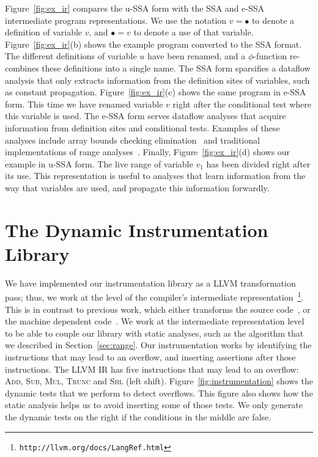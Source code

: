 \documentclass[preprint]{sigplanconf}[10pt]
\begin{document}
Figure~\ref{fig:ex_ir} compares the u-SSA form with the SSA and e-SSA
intermediate program representations.
We use the notation $v = \bullet$ to denote a definition of variable $v$, and
$\bullet = v$ to denote a use of that variable.
Figure~\ref{fig:ex_ir}(b) shows the example program converted to the SSA format.
The different definitions of variable $u$ have been renamed, and a
$\phi$-function re-combines these definitions into a single name.
The SSA form sparsifies a dataflow analysis that only extracts information from
the definition sites of variables, such as constant propagation.
Figure~\ref{fig:ex_ir}(c) shows the same program in e-SSA form.
This time we have renamed variable $v$ right after the conditional test where
this variable is used.
The e-SSA form serves dataflow analyses that acquire information from definition
sites and conditional tests.
Examples of these analyses include array bounds checking
elimination~\cite{Bodik00} and traditional implementations of range
analyses~\cite{Gough94,Patterson95}.
Finally, Figure~\ref{fig:ex_ir}(d) shows our example in u-SSA form.
The live range of variable $v_1$ has been divided right after its use.
This representation is useful to analyses that learn information from the way
that variables are used, and propagate this information forwardly.

\section{The Dynamic Instrumentation Library}
\label{sec:dyn}

We have implemented our instrumentation library as a LLVM transformation pass;
thus, we work at the level of the compiler's intermediate
representation~\footnote{\texttt{http://llvm.org/docs/LangRef.html}}.
This is in contrast to previous work, which either transforms the
source code~\cite{Dietz12}, or the machine dependent code~\cite{Brumley07}.
We work at the intermediate representation level to be able to couple our
library with static analyses, such as the algorithm that we described in
Section~\ref{sec:range}.
Our instrumentation works by identifying the instructions that may 
lead to an overflow, and inserting assertions after those instructions. 
The LLVM IR has five instructions that may lead to an overflow:
\textsc{Add}, \textsc{Sub}, \textsc{Mul},  \textsc{Trunc} and \textsc{Shl}
(left shift).
Figure~\ref{fig:instrumentation} shows the dynamic tests that we perform to
detect overflows.
This figure also shows how the static analysis helps us to avoid inserting
some of those tests.
We only generate the dynamic tests on the right if the conditions in the middle
are false.
\end{document}
